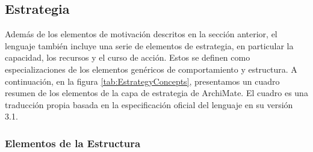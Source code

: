 \subsection{Estrategia}

Además de los elementos de motivación descritos en la sección anterior, el lenguaje también incluye una serie de elementos de estrategia, en particular la capacidad, los recursos y el curso de acción. Estos se definen como especializaciones de los elementos genéricos de comportamiento y estructura. A continuación, en la figura \ref{tab:EstrategyConcepts}, presentamos un cuadro resumen de los elementos de la capa de estrategia de ArchiMate. El cuadro es una traducción propia basada en la especificación oficial del lenguaje en su versión 3.1.

\newpage
\subsubsection{Elementos de la Estructura}
